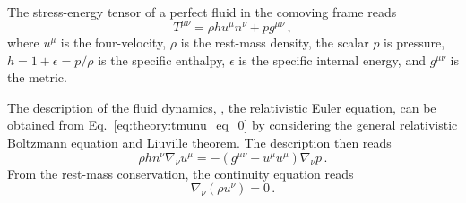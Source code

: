 The stress-energy tensor of a perfect fluid in the comoving frame 
reads 
%
\begin{equation}
T^{\mu\nu} = \rho h u^{\mu}n^{\nu} + p g^{\mu\nu}\, ,
\label{eq:theory:tmunu_perf}
\end{equation}
%
where $u^{\mu}$ is the four-velocity,
$\rho$ is the rest-mass density, the scalar $p$ is pressure, 
$h = 1 + \epsilon = p/\rho$ is the specific enthalpy, 
$\epsilon$ is the specific internal energy, and $g^{\mu\nu}$ is the metric.

The description of the fluid dynamics, \ie, the relativistic Euler equation, 
can be obtained from Eq.~\eqref{eq:theory:tmunu_eq_0} 
by considering the general relativistic Boltzmann equation and Liuville theorem. 
The description then reads 
%
\begin{equation}
\rho h n^{\nu} \nabla_{\nu}u^{\mu} = - (g^{\mu\nu} + u^{\mu}u^{\mu})\nabla_{\nu}p\, .
\end{equation}
%
From the rest-mass conservation, the continuity equation reads 
%
\begin{equation}
\nabla_{\nu}(\rho u^{\nu}) = 0\, .
\label{eq:theory:contineq}
\end{equation}
%


